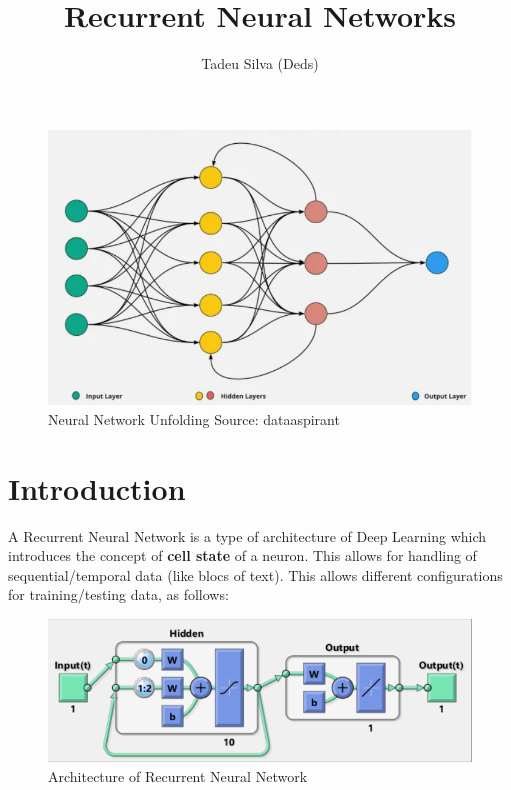 \documentclass[12pt]{article}
\title{Recurrent Neural Networks}
\author{Tadeu Silva (Deds)}
\begin{document}
\maketitle

\begin{figure}[H]
    \centering
    \includegraphics[width=0.9\linewidth]{images/rnn_overview.png}
    \caption{Neural Network Unfolding Source: dataaspirant}
    \label{fig1}
\end{figure}   

\newpage

\section{Introduction}
A Recurrent Neural Network is a type of architecture of Deep Learning which introduces the concept of \textbf{cell state} of a neuron. This allows for handling of sequential/temporal data (like blocs of text). This allows different configurations for training/testing data, as follows:


\begin{figure}[H]
    \centering
    \includegraphics[width=0.79\linewidth]{images/rnn_example.png}
    \caption{Architecture of Recurrent Neural Network}
    \label{fig2}
\end{figure}   
\end{document}
